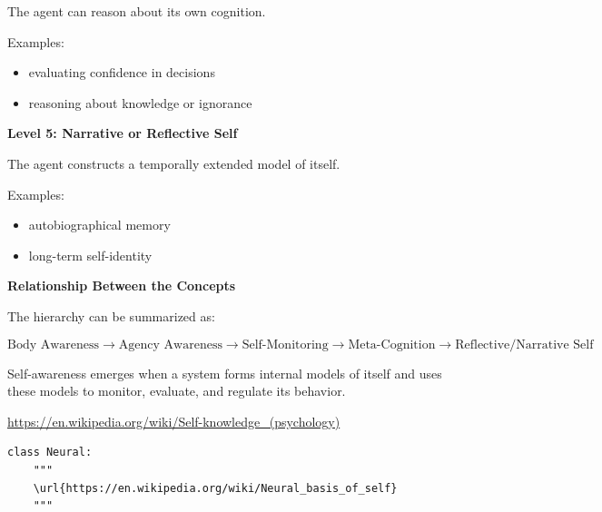 \documentclass{book}
\providecommand{\ProjectDeepHeading}[2]{%
    \par\medskip\noindent\textbf{#2}\par\smallskip
}
\begin{document}
            The agent can reason about its own cognition.
            
            Examples:
            
            \begin{itemize}
                \item evaluating confidence in decisions
                \item reasoning about knowledge or ignorance
            \end{itemize}
        
        \ProjectDeepHeading{7}{Level 5: Narrative or Reflective Self}
            
            The agent constructs a temporally extended model of itself.
            
            Examples:
            
            \begin{itemize}
                \item autobiographical memory
                \item long-term self-identity
            \end{itemize}
    
    
    \ProjectDeepHeading{6}{Relationship Between the Concepts}
        
        The hierarchy can be summarized as:
        
        \[
            \text{Body Awareness}
            \rightarrow
            \text{Agency Awareness}
            \rightarrow
            \text{Self-Monitoring}
            \rightarrow
            \text{Meta-Cognition}
            \rightarrow
            \text{Reflective/Narrative Self}
        \]
        
        Self-awareness emerges when a system forms internal models of itself and uses these models to monitor, evaluate, and regulate its behavior.


\url{https://en.wikipedia.org/wiki/Self-knowledge_(psychology)}


\begin{verbatim}
class Neural:
    """
    \url{https://en.wikipedia.org/wiki/Neural_basis_of_self}
    """
\end{verbatim}
\end{document}
